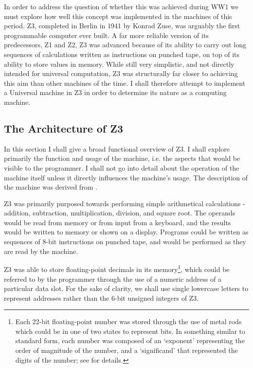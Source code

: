 \documentclass[Master.tex]{subfiles}
\begin{document}
In order to address the question of whether this was achieved during WW1 we must explore how well this concept was implemented in the machines of this period. Z3, completed in Berlin in 1941 by Konrad Zuse, was arguably the first programmable computer ever built. A far more reliable version of its predecessors, Z1 and Z2, Z3 was advanced because of its ability to carry out long sequences of calculations written as instructions on punched tape, on top of its ability to store values in memory. While still very simplistic, and not directly intended for universal computation, Z3 was structurally far closer to achieving this aim than other machines of the time. I shall therefore attempt to implement a Universal machine in Z3 in order to determine its nature as a computing machine.

\subsection{The Architecture of Z3}

In this section I shall give a broad functional overview of Z3. I shall explore primarily the function and usage of the machine, i.e. the aspects that would be visible to the programmer. I shall not go into detail about the operation of the machine itself unless it directly influences the machine's usage. The description of the machine was derived from \cite{rojas1997z3architecture}.

Z3 was primarily purposed towards performing simple arithmetical calculations - addition, subtraction, multiplication, division, and square root. The operands would be read from memory or from input from a keyboard, and the results would be written to memory or shown on a display. Programs could be written as sequences of 8-bit instructions on punched tape, and would be performed as they are read by the machine.

Z3 was able to store floating-point decimals in its memory\footnote{Each 22-bit floating-point number was stored through the use of metal rods which could be in one of two states to represent bits. In  something similar to standard form, each number was composed of an `exponent' representing the order of magnitude of the number, and a `significand' that represented the digits of the number; see \cite{rojas1997z3architecture} for details.}, which could be referred to by the programmer through the use of a numeric address of a particular data slot. For the sake of clarity, we shall use single lowercase letters to represent addresses rather than the 6-bit unsigned integers of Z3.
\end{document}
